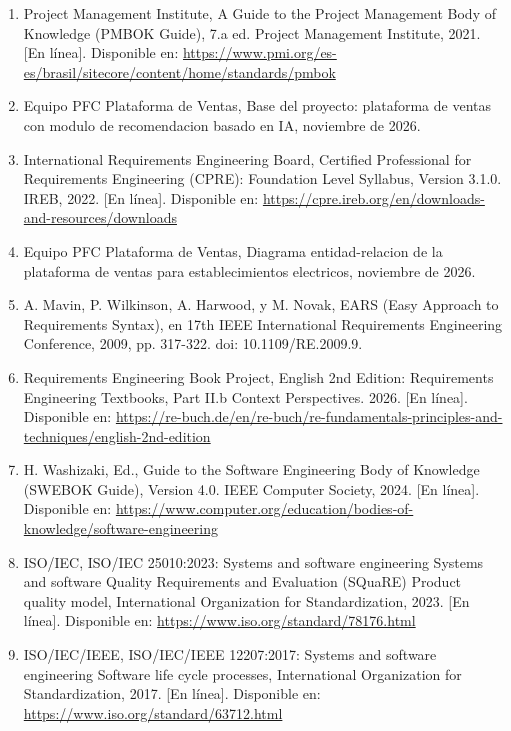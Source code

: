 \begingroup
\small
\setlength{\parindent}{0pt}
\setlength{\parskip}{3pt}
\renewcommand{\labelenumi}{[\arabic{enumi}]}
\begin{enumerate}
\item Project Management Institute, A Guide to the Project Management Body of Knowledge (PMBOK Guide), 7.a ed. Project Management Institute, 2021. [En línea]. Disponible en: \url{https://www.pmi.org/es-es/brasil/sitecore/content/home/standards/pmbok}
\item Equipo PFC Plataforma de Ventas, Base del proyecto: plataforma de ventas con modulo de recomendacion basado en IA, noviembre de 2026.
\item International Requirements Engineering Board, Certified Professional for Requirements Engineering (CPRE): Foundation Level Syllabus, Version 3.1.0. IREB, 2022. [En línea]. Disponible en: \url{https://cpre.ireb.org/en/downloads-and-resources/downloads}
\item Equipo PFC Plataforma de Ventas, Diagrama entidad-relacion de la plataforma de ventas para establecimientos electricos, noviembre de 2026.
\item A. Mavin, P. Wilkinson, A. Harwood, y M. Novak, EARS (Easy Approach to Requirements Syntax), en 17th IEEE International Requirements Engineering Conference, 2009, pp. 317-322. doi: 10.1109/RE.2009.9.
\item Requirements Engineering Book Project, English 2nd Edition: Requirements Engineering Textbooks, Part II.b Context Perspectives. 2026. [En línea]. Disponible en: \url{https://re-buch.de/en/re-buch/re-fundamentals-principles-and-techniques/english-2nd-edition}
\item H. Washizaki, Ed., Guide to the Software Engineering Body of Knowledge (SWEBOK Guide), Version 4.0. IEEE Computer Society, 2024. [En línea]. Disponible en: \url{https://www.computer.org/education/bodies-of-knowledge/software-engineering}
\item ISO/IEC, ISO/IEC 25010:2023: Systems and software engineering Systems and software Quality Requirements and Evaluation (SQuaRE) Product quality model, International Organization for Standardization, 2023. [En línea]. Disponible en: \url{https://www.iso.org/standard/78176.html}
\item ISO/IEC/IEEE, ISO/IEC/IEEE 12207:2017: Systems and software engineering Software life cycle processes, International Organization for Standardization, 2017. [En línea]. Disponible en: \url{https://www.iso.org/standard/63712.html}

\end{enumerate}
